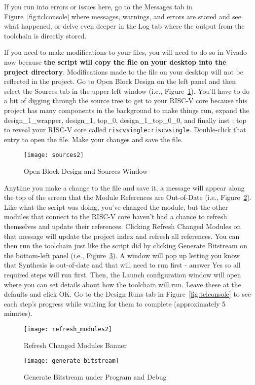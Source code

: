 \documentclass{article}
\begin{document}
\begin{enumerate}
If you run into errors or issues here, go to the Messages tab
in Figure~\ref{fig:tclconsole} where messages, warnings, and errors are stored and see
what happened, or delve even deeper in the Log tab where the output from the
toolchain is directly stored.

If you need to make modifications to your files,
you will need to do so in Vivado now because \textbf{the script will copy the
file on your desktop into the project directory}.  Modifications made to the
file on your desktop will not be reflected in the project.  Go to Open Block
Design on the left panel and then select the Sources tab in the upper left
window (i.e., Figure~\ref{fig:sources}).  You'll have to do a bit of digging through
the source tree to get to
your RISC-V core because this project has many components in the background to make
things run, expand the design\_1\_wrapper, design\_1, top\_0,
design\_1\_top\_0\_0, and finally inst : top to reveal your RISC-V core called
\verb|riscvsingle:riscvsingle|.  Double-click that entry to open the file.  Make your changes
and save the file.
\begin{figure}[h!]
  \centering
  \texttt{[image: sources2]}
  \caption{Open Block Design and Sources Window}
  \label{fig:sources}
\end{figure}

Anytime you make a change to the file and save it, a message will appear along
the top of the screen that the Module References are Out-of-Date
(i.e., Figure~\ref{fig:refreshmodules}).  Like what the
script was doing, you've changed the module, but the other modules that connect
to the RISC-V core haven't had a chance to refresh themselves and update their
references.  Clicking Refresh Changed Modules on that message will update the
project index and refresh all references.  You can then run the toolchain just
like the script did by clicking Generate Bitstream on the bottom-left
panel (i.e., Figure~\ref{fig:generatebitstream}).  A
window will pop up letting you know that Synthesis is out-of-date and that will
need to run first - answer Yes so all required steps will run first.  Then, the
Launch configuration window will open where you can set details about how the
toolchain will run.  Leave these at the defaults and click OK.  Go
to the Design Runs tab in Figure~\ref{fig:tclconsole} to see each step's
progress while waiting for them to complete (approximately 5 minutes).
\begin{figure}[h!]
	\centering
	\texttt{[image: refresh\_modules2]}
	\caption{Refresh Changed Modules Banner}
	\label{fig:refreshmodules}
\end{figure}
\begin{figure}[h!]
	\centering
	\texttt{[image: generate\_bitstream]}
	\caption{Generate Bitstream under Program and Debug}
	\label{fig:generatebitstream}
\end{figure}


\end{enumerate}
\end{document}
